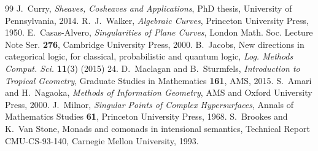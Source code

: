 \documentclass[11pt]{article}
\theoremstyle{definition}\newtheorem{definition}[theorem]{Definition}\newtheorem{remark}[theorem]{Remark}\newtheorem{example}[theorem]{Example}
\begin{document}
\begin{thebibliography}{99}
 J.~Curry, \emph{Sheaves, Cosheaves and Applications}, PhD thesis, University of Pennsylvania, 2014.
 R.~J.~Walker, \emph{Algebraic Curves}, Princeton University Press, 1950.
 E.~Casas-Alvero, \emph{Singularities of Plane Curves}, London Math. Soc. Lecture Note Ser. \textbf{276}, Cambridge University Press, 2000.
 B.~Jacobs, New directions in categorical logic, for classical, probabilistic and quantum logic, \emph{Log. Methods Comput. Sci.} \textbf{11}(3) (2015) 24.
 D.~Maclagan and B.~Sturmfels, \emph{Introduction to Tropical Geometry}, Graduate Studies in Mathematics \textbf{161}, AMS, 2015.
 S.~Amari and H.~Nagaoka, \emph{Methods of Information Geometry}, AMS and Oxford University Press, 2000.
 J.~Milnor, \emph{Singular Points of Complex Hypersurfaces}, Annals of Mathematics Studies \textbf{61}, Princeton University Press, 1968.
 S.~Brookes and K.~Van Stone, Monads and comonads in intensional semantics, Technical Report CMU-CS-93-140, Carnegie Mellon University, 1993.
\end{thebibliography}

\appendix


\end{document}
